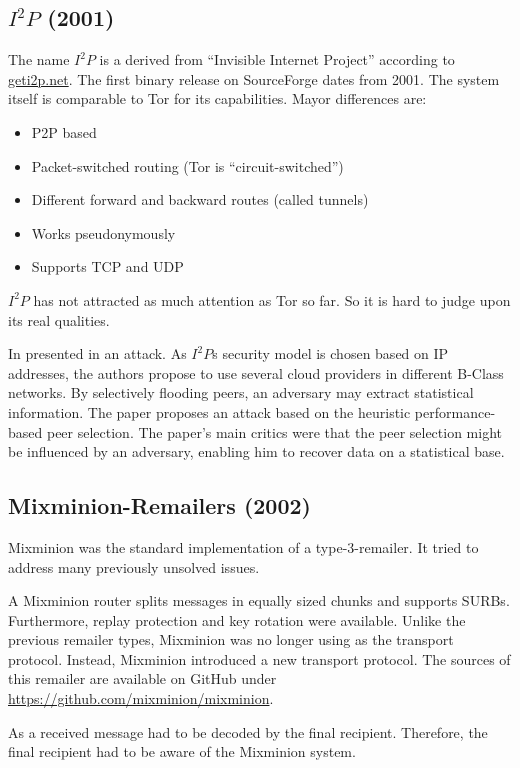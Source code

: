 \subsection{\texorpdfstring{$I^2P$}{I2P} (2001)}
The name $I^2P$ is a derived from  ``Invisible Internet Project'' according to \href{https://geti2p.net/}{geti2p.net}. The first binary release on SourceForge dates from 2001. The system itself is comparable to Tor for its capabilities. Mayor differences are:
\begin{itemize}
	\item P2P based
	\item Packet-switched routing (Tor is ``circuit-switched'')
	\item Different forward and backward routes (called tunnels)
	\item Works pseudonymously
	\item Supports TCP and UDP
\end{itemize}

$I^2P$ has not attracted as much attention as Tor so far. So it is hard to judge upon its real qualities.

In \citeyear{pets2011-i2p} \citeauthor{pets2011-i2p} presented in \cite{pets2011-i2p} an attack. As $I^2P$s security model is chosen based on IP addresses, the authors propose to use several cloud providers in different B-Class networks. By selectively flooding peers, an adversary may extract statistical information. The paper proposes an attack based on the heuristic performance-based peer selection. The paper's main critics were that the peer selection might be influenced by an adversary, enabling him to recover data on a statistical base.

\subsection{Mixminion-Remailers (2002)\label{sec:remMixminion}}
Mixminion was the standard implementation of a type-3-remailer. It tried to address many previously unsolved issues. 

A Mixminion router splits messages in equally sized chunks and supports SURBs. Furthermore,  replay protection and key rotation were available. Unlike the previous remailer types, Mixminion was no longer using  as the transport protocol. Instead, Mixminion introduced a new transport protocol. The sources of this remailer are available on GitHub under \url{https://github.com/mixminion/mixminion}.

As a received message had to be decoded by the final recipient. Therefore, the final recipient had to be aware of the Mixminion system.

